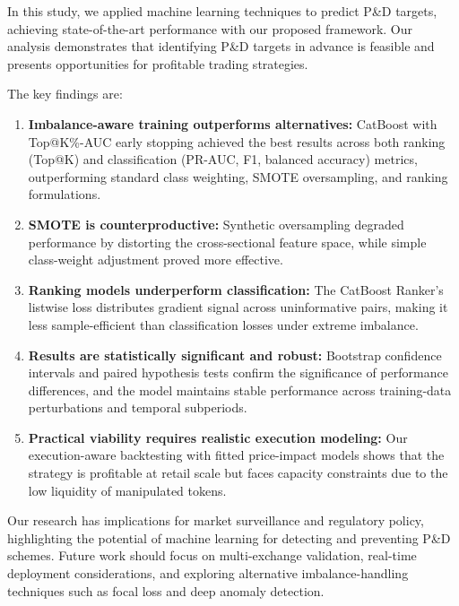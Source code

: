 \documentclass{ieeeaccess}
\begin{document}
In this study, we applied machine learning techniques to predict P\&D targets, achieving state-of-the-art performance with our proposed framework. Our analysis demonstrates that identifying P\&D targets in advance is feasible and presents opportunities for profitable trading strategies.

The key findings are:
\begin{enumerate}
    \item \textbf{Imbalance-aware training outperforms alternatives:} CatBoost with Top@K\%-AUC early stopping achieved the best results across both ranking (Top@K) and classification (PR-AUC, F1, balanced accuracy) metrics, outperforming standard class weighting, SMOTE oversampling, and ranking formulations.
    \item \textbf{SMOTE is counterproductive:} Synthetic oversampling degraded performance by distorting the cross-sectional feature space, while simple class-weight adjustment proved more effective.
    \item \textbf{Ranking models underperform classification:} The CatBoost Ranker's listwise loss distributes gradient signal across uninformative pairs, making it less sample-efficient than classification losses under extreme imbalance.
    \item \textbf{Results are statistically significant and robust:} Bootstrap confidence intervals and paired hypothesis tests confirm the significance of performance differences, and the model maintains stable performance across training-data perturbations and temporal subperiods.
    \item \textbf{Practical viability requires realistic execution modeling:} Our execution-aware backtesting with fitted price-impact models shows that the strategy is profitable at retail scale but faces capacity constraints due to the low liquidity of manipulated tokens.
\end{enumerate}

Our research has implications for market surveillance and regulatory policy, highlighting the potential of machine learning for detecting and preventing P\&D schemes. Future work should focus on multi-exchange validation, real-time deployment considerations, and exploring alternative imbalance-handling techniques such as focal loss and deep anomaly detection.
\end{document}
